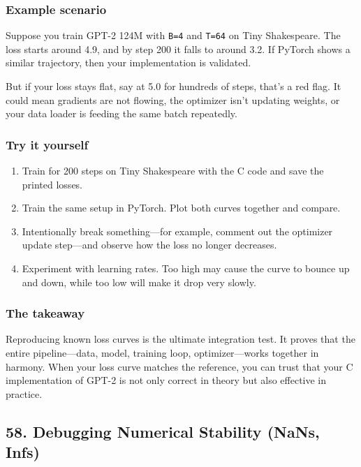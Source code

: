 \documentclass[
  letterpaper,
  DIV=11,
  numbers=noendperiod]{scrreprt}
\providecommand{\tightlist}{%
  \setlength{\itemsep}{0pt}\setlength{\parskip}{0pt}}
\begin{document}
\subsubsection{Example scenario}\label{example-scenario-1}

Suppose you train GPT-2 124M with \texttt{B=4} and \texttt{T=64} on Tiny
Shakespeare. The loss starts around 4.9, and by step 200 it falls to
around 3.2. If PyTorch shows a similar trajectory, then your
implementation is validated.

But if your loss stays flat, say at 5.0 for hundreds of steps, that's a
red flag. It could mean gradients are not flowing, the optimizer isn't
updating weights, or your data loader is feeding the same batch
repeatedly.

\subsubsection{Try it yourself}\label{try-it-yourself-45}

\begin{enumerate}
\def\labelenumi{\arabic{enumi}.}
\tightlist
\item
  Train for 200 steps on Tiny Shakespeare with the C code and save the
  printed losses.
\item
  Train the same setup in PyTorch. Plot both curves together and
  compare.
\item
  Intentionally break something---for example, comment out the optimizer
  update step---and observe how the loss no longer decreases.
\item
  Experiment with learning rates. Too high may cause the curve to bounce
  up and down, while too low will make it drop very slowly.
\end{enumerate}

\subsubsection{The takeaway}\label{the-takeaway-46}

Reproducing known loss curves is the ultimate integration test. It
proves that the entire pipeline---data, model, training loop,
optimizer---works together in harmony. When your loss curve matches the
reference, you can trust that your C implementation of GPT-2 is not only
correct in theory but also effective in practice.

\subsection{58. Debugging Numerical Stability (NaNs,
Infs)}\label{debugging-numerical-stability-nans-infs}
\end{document}
